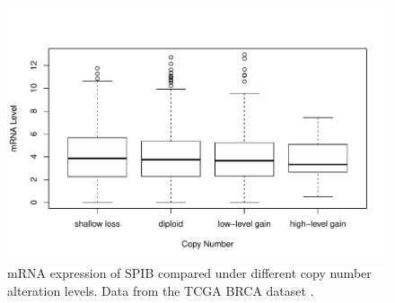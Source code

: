\begin{figure}[!p]
    \centering
    \includegraphics[scale=0.75]{figures/cnv.pdf}
    \caption{mRNA expression of SPIB compared under different copy number alteration levels. Data from the TCGA BRCA dataset \cite{Ciriello2015, Goldman2018}.}
    \label{cnv}
\end{figure} 
\clearpage

\clearpage